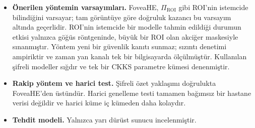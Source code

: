 \begin{itemize}
\item \textbf{Önerilen yöntemin varsayımları.} FoveaHE, $\Pi_{\mathrm{ROI}}$ gibi ROI'nin istemcide bilindiğini varsayar; tam görüntüye göre doğruluk kazancı bu varsayım altında geçerlidir. ROI'nin istemcide bir modelle tahmin edildiği durumun etkisi yalnızca göğüs röntgeninde, büyük bir ROI olan akciğer maskesiyle sınanmıştır. Yöntem yeni bir güvenlik kanıtı sunmaz; sızıntı denetimi ampiriktir ve zaman yan kanalı tek bir bilgisayarda ölçülmüştür. Kullanılan şifreli modeller sığdır ve tek bir CKKS parametre kümesi denenmiştir.
\item \textbf{Rakip yöntem ve harici test.} Şifreli özet yaklaşımı doğrulukta FoveaHE'den üstündür. Harici genelleme testi tamamen bağımsız bir hastane verisi değildir ve harici küme iç kümeden daha kolaydır.
\item \textbf{Tehdit modeli.} Yalnızca yarı dürüst sunucu incelenmiştir.
\end{itemize}
